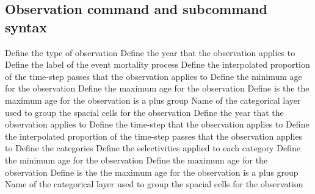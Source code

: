 \subsection{Observation command and subcommand syntax}
\par
{} {Define the type of observation}
 {Define the year that the observation applies to}
 {Define the label of the event mortality process}
 {Define the interpolated proportion of the time-step passes that the observation applies to}
 {Define the minimum age for the observation}
 {Define the maximum age for the observation}
 {Define is the the maximum age for the observation is a plus group}
 {Name of the categorical layer used to group the spacial cells for the observation}
 {Define the year that the observation applies to}
 {Define the time-step that the observation applies to}
 {Define the interpolated proportion of the time-step passes that the observation applies to}
 {Define the categories}
 {Define the selectivities applied to each category}
 {Define the minimum age for the observation}
 {Define the maximum age for the observation}
 {Define is the the maximum age for the observation is a plus group}
 {Name of the categorical layer used to group the spacial cells for the observation}
